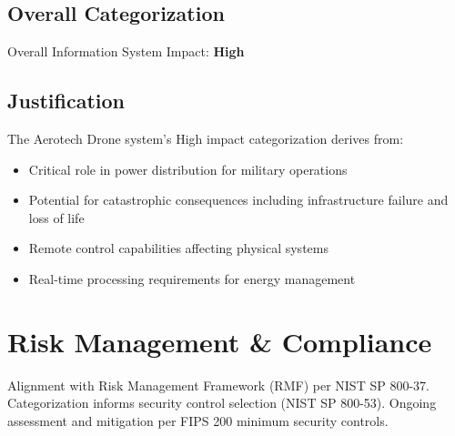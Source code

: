 \documentclass{article}
\begin{document}
\subsection{Overall Categorization}

Overall Information System Impact: \textcolor{navyblue}{\textbf{High}}
    
\subsection{Justification}
The Aerotech Drone system's High impact categorization derives from:

\begin{itemize}
\item Critical role in power distribution for military operations
\item Potential for catastrophic consequences including infrastructure failure and loss of life
\item Remote control capabilities affecting physical systems
\item Real-time processing requirements for energy management
\end{itemize}

\newpage

\section{Risk Management \& Compliance}

Alignment with Risk Management Framework (RMF) per NIST SP 800-37. Categorization informs security control selection (NIST SP 800-53). Ongoing assessment and mitigation per FIPS 200 minimum security controls.
\end{document}
